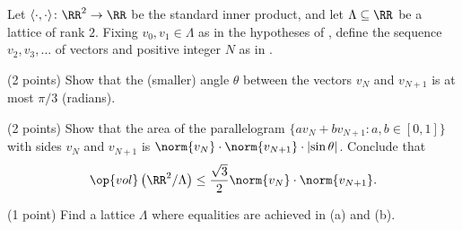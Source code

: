 \documentclass[../notes.tex]{subfiles}
\begin{document}
\begin{prob}[5 points]
	Let $\langle\cdot,\cdot\rangle\colon\RR^2\to\RR$ be the standard inner product, and let $\Lambda\subseteq\RR$ be a lattice of rank $2$. Fixing $v_0,v_1\in\Lambda$ as in the hypotheses of , define the sequence $v_2,v_3,\ldots$ of vectors and positive integer $N$ as in .
	\begin{listalph}
		\item (2 points) Show that the (smaller) angle $\theta$ between the vectors $v_N$ and $v_{N+1}$ is at most $\pi/3$ (radians).
		\item (2 points) Show that the area of the parallelogram $\{av_N+bv_{N+1}:a,b\in[0,1]\}$ with sides $v_N$ and $v_{N+1}$ is $\norm{v_N}\cdot\norm{v_{N+1}}\cdot\left|\sin\theta\right|$. Conclude that
		\[\op{vol}\left(\RR^2/\Lambda\right)\le\frac{\sqrt3}2\norm{v_N}\cdot\norm{v_{N+1}}.\]
		\item (1 point) Find a lattice $\Lambda$ where equalities are achieved in (a) and (b).
	\end{listalph}
\end{prob}
\end{document}
